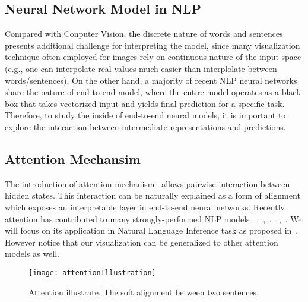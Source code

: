 \subsection{Neural Network Model in NLP}


Compared with Conputer Vision, the discrete nature of words and sentences
presents additional challenge for
interpreting the model, since many visualization technique often employed
for images rely on continuous nature of the input space (e.g., one can interpolate
real values much easier than interplolate between words/sentences).
%
On the other hand, a majority of recent NLP neural networks share the nature of
end-to-end model, where the entire model operates as a black-box that takes
vectorized input and yields final prediction for a specific task.
Therefore, to study the inside of end-to-end neural models, it is important to
explore the interaction between intermediate representations and predictions.

\subsection{Attention Mechansim}
\label{sec:attention}
The introduction of attention mechanism~\cite{bahdanau2014neural} allows
pairwise interaction between hidden states. This interaction can be naturally explained
as a form of alignment which exposes an interpretable layer in end-to-end neural networks.
Recently attention has contributed to many strongly-performed NLP models
~\cite{parikh2016emnlp},~\cite{rush2015neural},~\cite{yang2016hierarchical},
~\cite{seo2016bidirectional},~\cite{schwartz2017high}.
We will focus on its application in Natural Language Inference task as proposed in~\cite{parikh2016emnlp}.
However notice that our visualization can be generalized to other attention models as well.

\begin{figure}[htbp]
\centering
\vspace{-2mm}
 \texttt{[image: attentionIllustration]}
 \caption{Attention illustrate. The soft alignment between two sentences.}
\label{fig:attention}
\end{figure}

